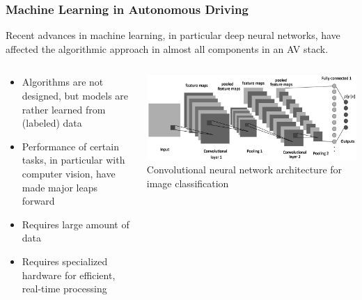 \begin{frame}
\frametitle{Machine Learning in Autonomous Driving}
Recent advances in machine learning, in particular deep neural networks, have
affected the algorithmic approach in almost all components in an AV stack.
\begin{columns}[]
    \begin{column}{0.4\textwidth}
        \begin{itemize}
            \item Algorithms are not designed, but models are rather learned
                from (labeled) data
            \item Performance of certain tasks, in particular with computer
                vision, have made major leaps forward
            \item Requires large amount of data
            \item Requires specialized hardware for efficient, real-time 
                processing
        \end{itemize}
    \end{column}
    \begin{column}{0.6\textwidth}
        \centering
        \includegraphics[width=\textwidth]{images/cnn_architecture.png}\\
        \footnotesize{Convolutional neural network architecture for image classification \cite{Albelwi2017}}
    \end{column}
\end{columns}
\end{frame}

